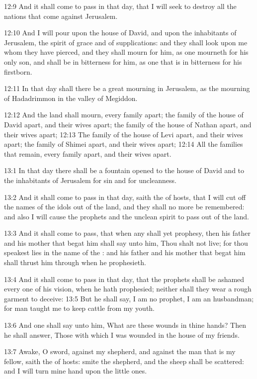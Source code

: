 12:9 And it shall come to pass in that day, that I will seek to
destroy all the nations that come against Jerusalem.

12:10 And I will pour upon the house of David, and upon the
inhabitants of Jerusalem, the spirit of grace and of supplications:
and they shall look upon me whom they have pierced, and they shall
mourn for him, as one mourneth for his only son, and shall be in
bitterness for him, as one that is in bitterness for his firstborn.

12:11 In that day shall there be a great mourning in Jerusalem, as the
mourning of Hadadrimmon in the valley of Megiddon.

12:12 And the land shall mourn, every family apart; the family of the
house of David apart, and their wives apart; the family of the house
of Nathan apart, and their wives apart; 12:13 The family of the house
of Levi apart, and their wives apart; the family of Shimei apart, and
their wives apart; 12:14 All the families that remain, every family
apart, and their wives apart.

13:1 In that day there shall be a fountain opened to the house of
David and to the inhabitants of Jerusalem for sin and for uncleanness.

13:2 And it shall come to pass in that day, saith the \LORD of hosts,
that I will cut off the names of the idols out of the land, and they
shall no more be remembered: and also I will cause the prophets and
the unclean spirit to pass out of the land.

13:3 And it shall come to pass, that when any shall yet prophesy, then
his father and his mother that begat him shall say unto him, Thou
shalt not live; for thou speakest lies in the name of the \LORD: and
his father and his mother that begat him shall thrust him through when
he prophesieth.

13:4 And it shall come to pass in that day, that the prophets shall be
ashamed every one of his vision, when he hath prophesied; neither
shall they wear a rough garment to deceive: 13:5 But he shall say, I
am no prophet, I am an husbandman; for man taught me to keep cattle
from my youth.

13:6 And one shall say unto him, What are these wounds in thine hands?
Then he shall answer, Those with which I was wounded in the house of
my friends.

13:7 Awake, O sword, against my shepherd, and against the man that is
my fellow, saith the \LORD of hosts: smite the shepherd, and the sheep
shall be scattered: and I will turn mine hand upon the little ones.

